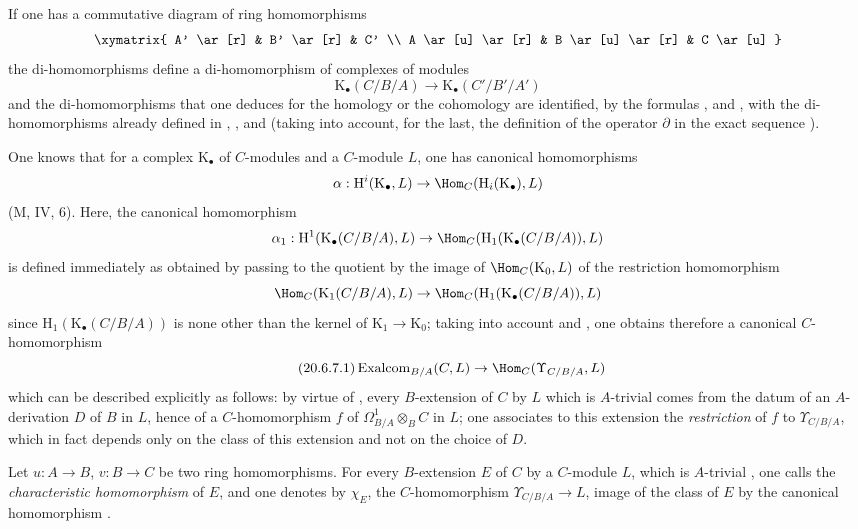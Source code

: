If one has a commutative diagram of ring homomorphisms
\[
\xymatrix{
  A' \ar[r] & B' \ar[r] & C' \\
  A \ar[u] \ar[r] & B \ar[u] \ar[r] & C \ar[u]
}
\]
the di-homomorphisms  define a di-homomorphism of complexes of modules
\begin{equation}
\tag{20.6.6.4}
  \label{0.20.6.6.4}
  \mathrm{K}_\bullet(C/B/A)\to\mathrm{K}_\bullet(C'/B'/A')
\end{equation}
and the di-homomorphisms that one deduces for the homology or the cohomology are identified, by the formulas ,  and , with the di-homomorphisms already defined in , ,  and  (taking into account, for the last, the definition of the operator $\partial$ in the exact sequence ).

\begin{env}[20.6.7]
\label{0.20.6.7}
One knows that for a complex $\mathrm{K}_\bullet$ of $C$-modules and a $C$-module $L$, one has canonical homomorphisms
\[
  \alpha:\mathrm{H}^i(\mathrm{K}_\bullet,L)\to\Hom_C(\mathrm{H}_i(\mathrm{K}_\bullet),L)
\]
(M, IV, 6).
Here, the canonical homomorphism
\[
  \alpha_1:\mathrm{H}^1(\mathrm{K}_\bullet(C/B/A),L)\to\Hom_C(\mathrm{H}_1(\mathrm{K}_\bullet(C/B/A)),L)
\]
is defined immediately as obtained by passing to the quotient by the image of $\Hom_C(\mathrm{K}_0,L)$ of the restriction homomorphism
\[
  \Hom_C(\mathrm{K}_1(C/B/A),L)\to\Hom_C(\mathrm{H}_1(\mathrm{K}_\bullet(C/B/A)),L)
\]
since $\mathrm{H}_1(\mathrm{K}_\bullet(C/B/A))$ is none other than the kernel of $\mathrm{K}_1\to\mathrm{K}_0$; taking into account  and , one obtains therefore a canonical $C$-homomorphism
\begin{equation}
\tag{20.6.7.1}
  \label{0.20.6.7.1}
  \operatorname{Exalcom}_{B/A}(C,L)\to\Hom_C(\Upsilon_{C/B/A},L)
\end{equation}
which can be described explicitly as follows: by virtue of , every $B$-extension of $C$ by $L$ which is $A$-trivial comes from the datum of an $A$-derivation $D$ of $B$ in $L$, hence  of a $C$-homomorphism $f$ of $\Omega^1_{B/A}\otimes_B C$ in $L$; one associates to this extension the \emph{restriction} of $f$ to $\Upsilon_{C/B/A}$, which in fact depends only on the class of this extension and not on the choice of $D$.
\end{env}

\begin{definition}[20.6.8]
\label{0.20.6.8}
Let $u:A\to B$, $v:B\to C$ be two ring homomorphisms.
For every $B$-extension $E$ of $C$ by a $C$-module $L$, which is $A$-trivial , one calls the \emph{characteristic homomorphism} of $E$, and one denotes by $\chi_E$, the $C$-homomorphism $\Upsilon_{C/B/A}\to L$, image of the class of $E$ by the canonical homomorphism .
\end{definition}

